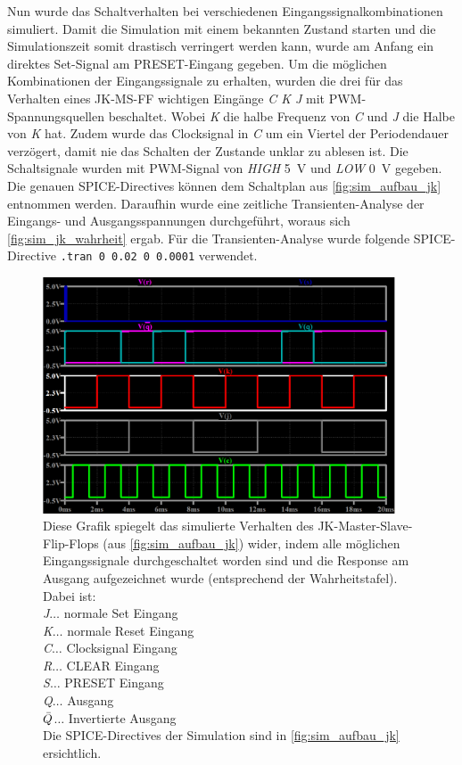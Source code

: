 \documentclass[12pt,english,ngerman]{scrartcl}
\begin{document}
Nun wurde das Schaltverhalten bei verschiedenen Eingangssignalkombinationen
simuliert. 
Damit die Simulation mit einem bekannten Zustand starten und die
Simulationszeit somit drastisch verringert werden kann, wurde am Anfang ein
direktes Set-Signal am PRESET-Eingang gegeben.
Um die möglichen Kombinationen der Eingangssignale zu erhalten, wurden
die drei für das Verhalten eines JK-MS-FF wichtigen Eingänge \textit{C K J}
mit PWM-Spannungsquellen beschaltet. Wobei \textit{K} die halbe Frequenz von \textit{C} und \textit{J} die
Halbe von \textit{K} hat. Zudem wurde das Clocksignal in \textit{C} um ein Viertel der
Periodendauer verzögert, damit nie das Schalten der Zustande unklar zu ablesen
ist.
Die Schaltsignale wurden mit PWM-Signal von \textit{HIGH} \SI{5}{\volt} und
\textit{LOW} \SI{0}{\volt} gegeben. Die genauen SPICE-Directives können dem
Schaltplan aus \autoref{fig:sim_aufbau_jk} entnommen werden. Daraufhin wurde
eine zeitliche Transienten-Analyse der Eingangs- und Ausgangsspannungen
durchgeführt, woraus sich \autoref{fig:sim_jk_wahrheit} ergab. Für die
Transienten-Analyse wurde folgende SPICE-Directive \texttt{.tran 0 0.02 0 0.0001}
verwendet.
\begin{figure}[H]
  \centering
  \includegraphics[width=\linewidth, height=7cm]{./figures/sim/jk/WahrheitstabelleJK.png}
  \caption{Diese Grafik spiegelt das simulierte Verhalten des JK-Master-Slave-Flip-Flops (aus
    \autoref{fig:sim_aufbau_jk}) wider, indem alle möglichen Eingangssignale
    durchgeschaltet worden sind und die Response am Ausgang aufgezeichnet
    wurde (entsprechend der Wahrheitstafel). 
    Dabei ist:\\
    \textit{J}$\dots$ normale Set Eingang\\
    \textit{K}$\dots$ normale Reset Eingang\\
    \textit{C}$\dots$ Clocksignal Eingang\\
    \textit{R}$\dots$ CLEAR Eingang\\
    \textit{S}$\dots$ PRESET Eingang\\
    \textit{Q}$\dots$ Ausgang\\
    \textit{$\Bar{Q}$}$\dots$ Invertierte Ausgang\\
    Die SPICE-Directives der Simulation sind in \autoref{fig:sim_aufbau_jk}
    ersichtlich.}
  \label{fig:sim_jk_wahrheit}
\end{figure}
\end{document}
